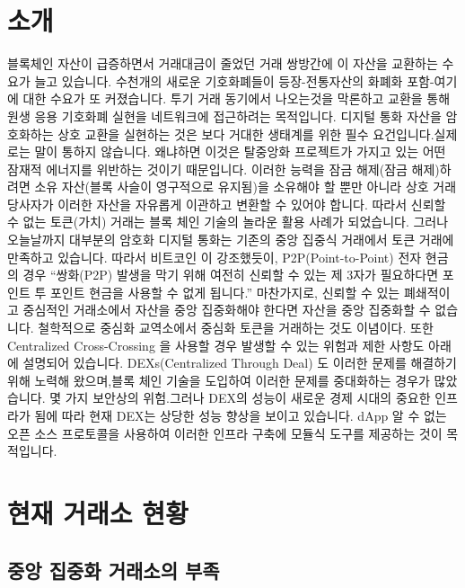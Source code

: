 \documentclass{article}
\begin{document}
\begin{multicols}{2}
\linespread{1.5}
\section{소개\label{sec:introduction}}
	\indent 블록체인 자산이 급증하면서 거래대금이 줄었던 거래 쌍방간에 이 자산을 교환하는 수요가 늘고 있습니다. 수천개의 새로운 기호화폐들이 등장-전통자산의 화폐화 포함-여기에 대한 수요가 또 커졌습니다. 투기 거래 동기에서 나오는것을 막론하고 교환을 통해 원생 응용 기호화폐 실현을 네트워크에 접근하려는 목적입니다. 디지털 통화 자산을 암호화하는 상호 교환을 실현하는 것은 보다 거대한 생태계를 위한 필수 요건입니다.실제로는 말이 통하지 않습니다. 왜냐하면 이것은 탈중앙화 프로젝트가 가지고 있는 어떤 잠재적 에너지를 위반하는 것이기 때문입니다. \cite{desotocapital} 이러한 능력을 잠금 해제(잠금 해제)하려면 소유 자산(블록 사슬이 영구적으로 유지됨)을 소유해야 할 뿐만 아니라 상호 거래 당사자가 이러한 자산을 자유롭게 이관하고 변환할 수 있어야 합니다. 따라서 신뢰할 수 없는 토큰(가치) 거래는 블록 체인 기술의 놀라운 활용 사례가 되었습니다. 그러나 오늘날까지 대부분의 암호화 디지털 통화는 기존의 중앙 집중식 거래에서 토큰 거래에 만족하고 있습니다. 따라서 비트코인 \cite{nakamoto2008bitcoin}이 강조했듯이, P2P(Point-to-Point) 전자 현금의 경우 “쌍화(P2P) 발생을 막기 위해 여전히 신뢰할 수 있는 제 3자가 필요하다면 포인트 투 포인트 현금을 사용할 수 없게 됩니다.” 마찬가지로, 신뢰할 수 있는 폐쇄적이고 중심적인 거래소에서 자산을 중앙 집중화해야 한다면 자산을 중앙 집중화할 수 없습니다. 철학적으로 중심화 교역소에서 중심화 토큰을 거래하는 것도 이념이다. 또한 Centralized Cross-Crossing 을 사용할 경우 발생할 수 있는 위험과 제한 사항도 아래에 설명되어 있습니다. DEXs(Centralized Through Deal) \cite{schuh2015bitshares} \cite{bancor} \cite{kyber}도 이러한 문제를 해결하기 위해 노력해 왔으며,블록 체인 기술을 도입하여 이러한 문제를 중대화하는 경우가 많았습니다. 몇 가지 보안상의 위험.그러나 DEX의 성능이 새로운 경제 시대의 중요한 인프라가 됨에 따라 현재 DEX는 상당한 성능 향상을 보이고 있습니다. dApp 알 수 없는 오픈 소스 프로토콜을 사용하여 이러한 인프라 구축에 모듈식 도구를 제공하는 것이 목적입니다. 
	
\section{현재 거래소 현황\label{sec:current_exchange_landscape}}

\subsection{중앙 집중화 거래소의 부족}


\end{multicols}
\end{document}
